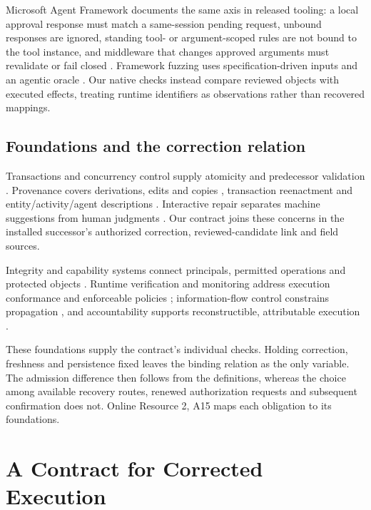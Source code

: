 \documentclass[pdflatex,sn-basic]{sn-jnl}
\begin{document}
Microsoft Agent Framework documents the same axis in released tooling: a local approval response must match a same-session pending request, unbound responses are ignored, standing tool- or argument-scoped rules are not bound to the tool instance, and middleware that changes approved arguments must revalidate or fail closed \citep{msaf-tool-approval}. Framework fuzzing uses specification-driven inputs and an agentic oracle \citep{logicunter}. Our native checks instead compare reviewed objects with executed effects, treating runtime identifiers as observations rather than recovered mappings.

\subsection{Foundations and the correction relation}\label{foundations-and-the-correction-relation}

Transactions and concurrency control supply atomicity and predecessor validation \citep{gray-transaction,kung-occ}. Provenance covers derivations, edits and copies \citep{buneman-provenance,cheney-provenance,buneman-curated}, transaction reenactment \citep{arab-reenactment} and entity/activity/agent descriptions \citep{prov-dm}. Interactive repair separates machine suggestions from human judgments \citep{yakout-guided-repair,falcon-cleaning}. Our contract joins these concerns in the installed successor's authorized correction, reviewed-candidate link and field sources.

Integrity and capability systems connect principals, permitted operations and protected objects \citep{clark-wilson,hardy-confused-deputy,miller-robust-composition}. Runtime verification and monitoring address execution conformance and enforceable policies \citep{runtime-verification,policy-enforcement}; information-flow control constrains propagation \citep{ifc}, and accountability supports reconstructible, attributable execution \citep{accountability}.

These foundations supply the contract's individual checks. Holding correction, freshness and persistence fixed leaves the binding relation as the only variable. The admission difference then follows from the definitions, whereas the choice among available recovery routes, renewed authorization requests and subsequent confirmation does not. Online Resource 2, A15 maps each obligation to its foundations.

\section{A Contract for Corrected Execution}\label{a-contract-for-corrected-execution}
\end{document}

